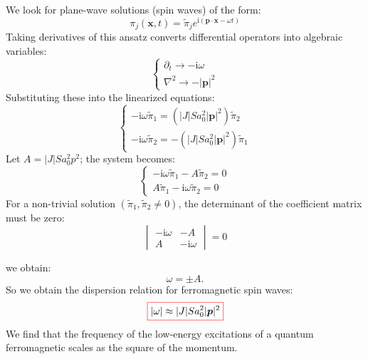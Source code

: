We look for plane-wave solutions (spin waves) of the form:
\begin{equation}
\pi_j(\bm{x}, t) = \tilde{\pi}_j e^{\mathrm{i}(\bm{p} \cdot \bm{x} - \omega t)}
\end{equation}
Taking derivatives of this ansatz converts differential operators into algebraic variables:
\begin{equation}
\begin{cases}
\partial_t \to -\mathrm{i}\omega \\
\nabla^2 \to -|\bm{p}|^2
\end{cases}
\end{equation}
Substituting these into the linearized equations:
\begin{equation}
\begin{cases}
-\mathrm{i}\omega \tilde{\pi}_1 = (|J|S a_0^2 |\bm{p}|^2) \tilde{\pi}_2 \\
-\mathrm{i}\omega \tilde{\pi}_2 = -(|J|S a_0^2 |\bm{p}|^2) \tilde{\pi}_1
\end{cases}
\end{equation}
Let $A = |J|S a_0^2 p^2$; the system becomes:
\begin{equation}
\begin{cases}
-\mathrm{i}\omega \tilde{\pi}_1 - A \tilde{\pi}_2 = 0 \\
A \tilde{\pi}_1 - \mathrm{i}\omega \tilde{\pi}_2 = 0
\end{cases}
\end{equation}
For a non-trivial solution $(\tilde{\pi}_1, \tilde{\pi}_2 \neq 0)$, the determinant of the coefficient matrix must be zero:
\begin{equation}
\begin{vmatrix}
-\mathrm{i}\omega & -A \\
A & -\mathrm{i}\omega
\end{vmatrix} = 0
\end{equation}

we obtain:
\begin{equation}
\omega = \pm A.
\end{equation}
So we obtain the dispersion relation for ferromagnetic spin waves:
\begin{equation}
    \colorboxed{
    |\omega| \approx |J|S a_0^2 |\bm{p}|^2
    }
\end{equation}
We find that the frequency of the low-energy excitations of a quantum ferromagnetic scales as the square of the momentum.



